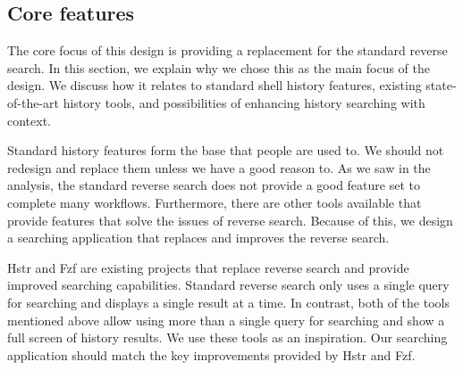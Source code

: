 \subsection{Core features}

The core focus of this design is providing a replacement for the standard reverse search. In this section, we explain why we chose this as the main focus of the design. We discuss how it relates to standard shell history features, existing state-of-the-art history tools, and possibilities of enhancing history searching with context.


Standard history features form the base that people are used to. We should not redesign and replace them unless we have a good reason to.
As we saw in the analysis, the standard reverse search does not provide a good feature set to complete many workflows. Furthermore, there are other tools available that provide features that solve the issues of reverse search. Because of this, we design a searching application that replaces and improves the reverse search.




Hstr\cite{toolshstr} and Fzf\cite{tools-fzf} are existing projects that replace reverse search and provide improved searching capabilities. 
Standard reverse search only uses a single query for searching and displays a single result at a time. In contrast, both of the tools mentioned above allow using more than a single query for searching and show a full screen of history results. We use these tools as an inspiration. Our searching application should match the key improvements provided by Hstr and Fzf. 


